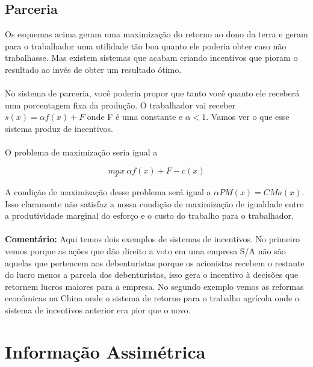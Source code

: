 \documentclass[a4paper,11pt,oneside]{book}
\theoremstyle{definition}
\theoremstyle{break}
\begin{document}
\subsection*{Parceria}

Os esquemas acima geram uma maximização do retorno ao dono da terra e geram para o trabalhador uma utilidade tão boa quanto ele poderia obter caso não trabalhasse. Mas existem sistemas que acabam criando incentivos que pioram o resultado ao invés de obter um resultado ótimo.
\\~\\
No sistema de parceria, você poderia propor que tanto você quanto ele receberá uma porcentagem fixa da produção. O trabalhador vai receber $s(x) = \alpha f(x) + F$ onde F é uma constante e $\alpha < 1$. Vamos ver o que esse sistema produz de incentivos.
\\~\\
O problema de maximização seria igual a 

$$ \underset{x}{max}\ \alpha f(x) + F - c(x) $$

A condição de maximização desse problema será igual a $\alpha PM(x) = CMa(x)$. Isso claramente não satisfaz a nossa condição de maximização de igualdade entre a produtividade marginal do esforço e o custo do trabalho para o trabalhador.
\\~\\
\textbf{Comentário:} Aqui temos dois exemplos de sistemas de incentivos. No primeiro vemos porque as ações que dão direito a voto em uma empresa S/A não são aquelas que pertencem aos debenturistas porque os acionistas recebem o restante do lucro menos a parcela dos debenturistas, isso gera o incentivo à decisões que retornem lucros maiores para a empresa. No segundo exemplo vemos as reformas econômicas na China onde o sistema de retorno para o trabalho agrícola onde o sistema de incentivos anterior era pior que o novo.

\section{Informação Assimétrica}
\end{document}
